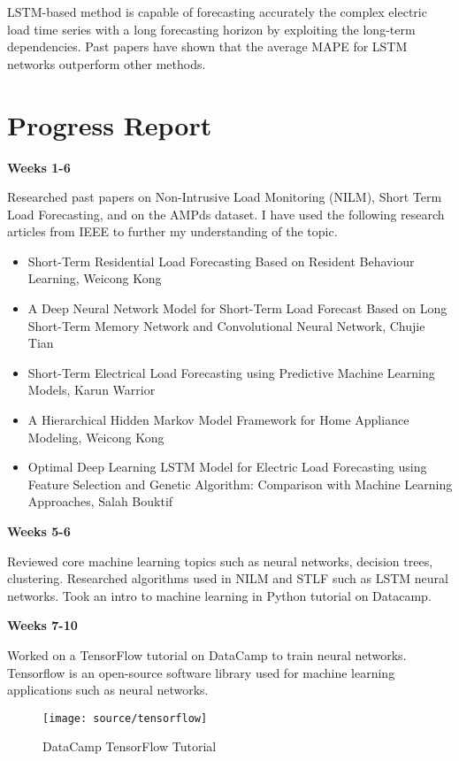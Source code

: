 \documentclass[12pt,twocolumn]{article}
\begin{document}
				LSTM-based method is capable of forecasting accurately the complex electric load time series with a long forecasting horizon by exploiting the long-term dependencies. Past papers have shown that the average MAPE for LSTM networks outperform other methods. 

	\section{Progress Report}
		\textbf{Weeks 1-6}

			Researched past papers on Non-Intrusive Load Monitoring (NILM), Short Term Load Forecasting, and on the AMPds dataset. I have used the following research articles from IEEE to further my understanding of the topic.

			\begin{itemize}
				\item Short-Term Residential Load Forecasting Based on Resident Behaviour Learning, Weicong Kong
				\item A Deep Neural Network Model for Short-Term Load Forecast Based on Long Short-Term Memory Network and Convolutional Neural Network, Chujie Tian
				\item Short-Term Electrical Load Forecasting using Predictive Machine Learning Models, Karun Warrior
				\item A Hierarchical Hidden Markov Model Framework for Home Appliance Modeling, Weicong Kong
				\item Optimal Deep Learning LSTM Model for Electric Load Forecasting using Feature Selection and Genetic Algorithm: Comparison with Machine Learning Approaches, Salah Bouktif
			\end{itemize}

		\textbf{Weeks 5-6}
			
			Reviewed core machine learning topics such as neural networks, decision trees, clustering. Researched algorithms used in NILM and STLF such as LSTM neural networks. Took an intro to machine learning in Python tutorial on Datacamp. 
			\newline

		\textbf{Weeks 7-10}

			Worked on a TensorFlow tutorial on DataCamp to train neural networks. Tensorflow is an open-source software library used for machine learning applications such as neural networks. 
			\newline

			\begin{figure}[!h]
					\centering
					\texttt{[image: source/tensorflow]}
					\caption{DataCamp TensorFlow Tutorial}
			\end{figure}
\end{document}
